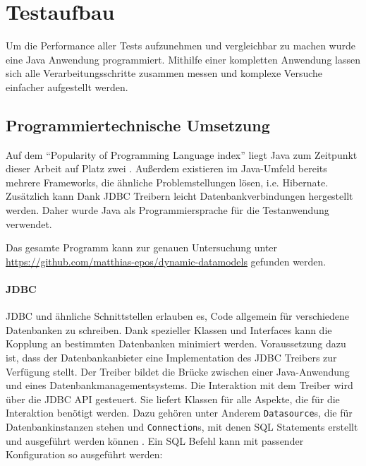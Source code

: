 
\label{sec:testaufbau}
\section{Testaufbau}

Um die Performance aller Tests aufzunehmen und vergleichbar zu machen wurde eine Java Anwendung programmiert. Mithilfe einer kompletten Anwendung lassen sich alle Verarbeitungsschritte zusammen messen und komplexe Versuche einfacher aufgestellt werden. 


\subsection{Programmiertechnische Umsetzung}

Auf dem ``Popularity of Programming Language index'' liegt Java zum Zeitpunkt dieser Arbeit auf Platz zwei \cite{pypl.01.07.2021}. Außerdem existieren im Java-Umfeld bereits mehrere Frameworks, die ähnliche Problemstellungen lösen, i.e. Hibernate. Zusätzlich kann Dank \ac{JDBC} Treibern leicht Datenbankverbindungen hergestellt werden. Daher wurde Java als Programmiersprache für die Testanwendung verwendet. 

Das gesamte Programm kann zur genauen Untersuchung unter \url{https://github.com/matthias-epos/dynamic-datamodels} gefunden werden.

\label{ppar:JDBC}
\paragraph{\acf{JDBC}}
\ac{JDBC} und ähnliche Schnittstellen erlauben es, Code allgemein für verschiedene Datenbanken zu schreiben. Dank spezieller Klassen und Interfaces kann die Kopplung an bestimmten Datenbanken minimiert werden. Voraussetzung dazu ist, dass der Datenbankanbieter eine Implementation des JDBC Treibers zur Verfügung stellt. Der Treiber bildet die Brücke zwischen einer Java-Anwendung und eines Datenbankmanagementsystems. Die Interaktion mit dem Treiber wird über die JDBC API gesteuert. Sie liefert Klassen für alle Aspekte, die für die Interaktion benötigt werden. Dazu gehören unter Anderem \lstinline|Datasource|s, die für Datenbankinstanzen stehen und \lstinline|Connection|s, mit denen SQL Statements erstellt und ausgeführt werden können \cite{Reese.2000}. Ein SQL Befehl kann mit passender Konfiguration so ausgeführt werden:

